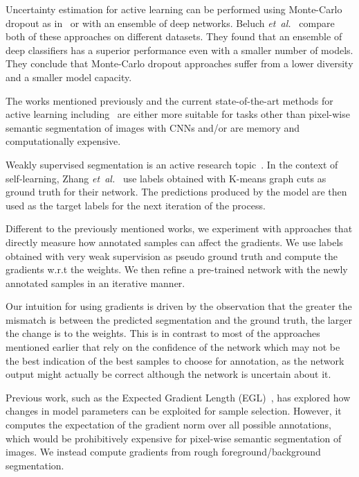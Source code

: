 \documentclass[letterpaper, 10 pt, conference]{ieeeconf}  %
\newcommand\etal{\emph{et~al.}}
\begin{document}
Uncertainty estimation for active learning can be performed using Monte-Carlo dropout as in~\cite{gal2017deep} or with an ensemble of deep networks. Beluch \etal~\cite{beluch2018power} compare both of these approaches on different datasets. They found that an ensemble of deep classifiers has a superior performance even with a smaller number of models. They conclude that Monte-Carlo dropout approaches suffer from a lower diversity and a smaller model capacity.

The works mentioned previously and the current state-of-the-art methods for active learning including~\cite{gal2017deep,beluch2018power,sener2017active,yoo2019learning} are either more suitable for tasks other than pixel-wise semantic segmentation of images with CNNs and/or are memory and computationally expensive.

Weakly supervised segmentation is an active research topic~\cite{wei2018revisiting, acuna2018efficient, tang2018normalized, kwak2017weakly}. In the context of self-learning, Zhang \etal~\cite{zhang2018self} use labels obtained with K-means graph cuts as ground truth for their network. The predictions produced by the model are then used as the target labels for the next iteration of the process.  

Different to the previously mentioned works, we experiment with approaches that directly measure how annotated samples can affect the gradients. We use labels obtained with very weak supervision as pseudo ground truth and compute the gradients w.r.t the weights. We then refine a pre-trained network with the newly annotated samples in an iterative manner. 

Our intuition for using gradients is driven by the observation that the greater the mismatch is between the predicted segmentation and the ground truth, the larger the change is to the weights. This is in contrast to most of the approaches mentioned earlier that rely on the confidence of the network which may not be the best indication of the best samples to choose for annotation, as the network output might actually be correct although the network is uncertain about it.

Previous work, such as the Expected Gradient Length (EGL)~\cite{huang2016active, settles2008multiple}, has explored how changes in model parameters can be exploited for sample selection. However, it computes the expectation of the gradient norm over all possible annotations, which would be prohibitively expensive for pixel-wise semantic segmentation of images. We instead compute gradients from rough foreground/background segmentation.
\end{document}
